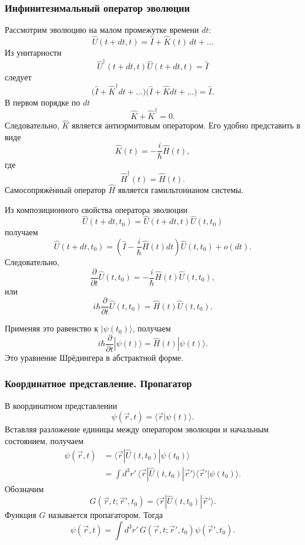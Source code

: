 \documentclass[12pt,a4paper]{article}
\begin{document}
\subsubsection{Инфинитезимальный оператор эволюции}

Рассмотрим эволюцию на малом промежутке времени $dt$:
\[
    \hat U(t+dt,t)
    =
    \hat I+\hat K(t)\,dt+\ldots
\]
Из унитарности
\[
    \hat U^\dagger(t+dt,t)\hat U(t+dt,t)=\hat I
\]
следует
\[
    \bigl(\hat I+\hat K^\dagger dt+\ldots\bigr)
    \bigl(\hat I+\hat Kdt+\ldots\bigr)
    =
    \hat I.
\]
В первом порядке по $dt$
\[
    \hat K+\hat K^\dagger=0.
\]
Следовательно, $\hat K$ является антиэрмитовым оператором. Его удобно
представить в виде
\[
    \boxed{
        \hat K(t)
        =
        -\frac{i}{\hbar}\hat H(t)
    },
\]
где
\[
    \boxed{
        \hat H^\dagger(t)=\hat H(t)
    }.
\]
Самосопряжённый оператор $\hat H$ является гамильтонианом системы.

Из композиционного свойства оператора эволюции
\[
    \hat U(t+dt,t_0)
    =
    \hat U(t+dt,t)\hat U(t,t_0)
\]
получаем
\[
    \hat U(t+dt,t_0)
    =
    \left(
        \hat I-\frac{i}{\hbar}\hat H(t)dt
    \right)
    \hat U(t,t_0)+o(dt).
\]
Следовательно,
\[
    \boxed{
        \frac{\partial}{\partial t}\hat U(t,t_0)
        =
        -\frac{i}{\hbar}
        \hat H(t)\hat U(t,t_0)
    },
\]
или
\[
    \boxed{
        i\hbar
        \frac{\partial}{\partial t}\hat U(t,t_0)
        =
        \hat H(t)\hat U(t,t_0)
    }.
\]

Применяя это равенство к $|\psi(t_0)\rangle$, получаем
\[
    \boxed{
        i\hbar
        \frac{\partial}{\partial t}
        |\psi(t)\rangle
        =
        \hat H(t)|\psi(t)\rangle
    }.
\]
Это уравнение Шрёдингера в абстрактной форме.


\subsubsection{Координатное представление. Пропагатор}

В координатном представлении
\[
    \psi(\vec r,t)
    =
    \langle\vec r|\psi(t)\rangle.
\]
Вставляя разложение единицы между оператором эволюции и начальным
состоянием, получаем
\[
\begin{aligned}
    \psi(\vec r,t)
    &=
    \langle\vec r|
        \hat U(t,t_0)
    |\psi(t_0)\rangle
    \\
    &=
    \int d^3r'\,
        \langle\vec r|
            \hat U(t,t_0)
        |\vec r'\rangle
        \langle\vec r'|\psi(t_0)\rangle.
\end{aligned}
\]
Обозначим
\[
    \boxed{
        G(\vec r,t;\vec r',t_0)
        =
        \langle\vec r|
            \hat U(t,t_0)
        |\vec r'\rangle
    }.
\]
Функция $G$ называется пропагатором. Тогда
\[
    \boxed{
    \psi(\vec r,t)
    =
    \int d^3r'\,
        G(\vec r,t;\vec r',t_0)
        \psi(\vec r',t_0)
    }.
\]
\end{document}
